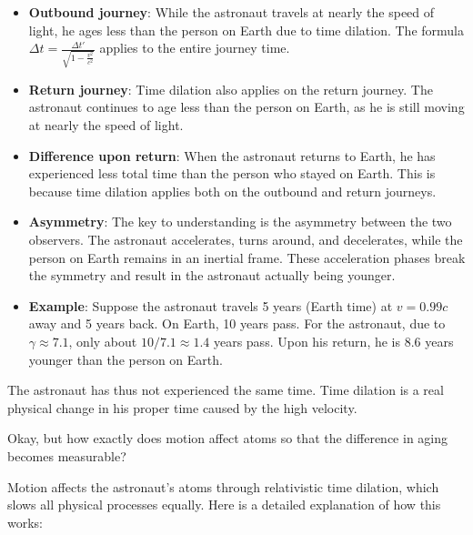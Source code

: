 \documentclass[a4paper,12pt]{article}
\begin{document}
	\begin{itemize}
		\item \textbf{Outbound journey}: While the astronaut travels at nearly the speed of light, he ages less than the person on Earth due to time dilation. The formula \( \Delta t = \frac{\Delta t'}{\sqrt{1 - \frac{v^2}{c^2}}} \) applies to the entire journey time.
		\item \textbf{Return journey}: Time dilation also applies on the return journey. The astronaut continues to age less than the person on Earth, as he is still moving at nearly the speed of light.
		\item \textbf{Difference upon return}: When the astronaut returns to Earth, he has experienced less total time than the person who stayed on Earth. This is because time dilation applies both on the outbound and return journeys.
		\item \textbf{Asymmetry}: The key to understanding is the asymmetry between the two observers. The astronaut accelerates, turns around, and decelerates, while the person on Earth remains in an inertial frame. These acceleration phases break the symmetry and result in the astronaut actually being younger.
		\item \textbf{Example}: Suppose the astronaut travels 5 years (Earth time) at \( v = 0.99c \) away and 5 years back. On Earth, 10 years pass. For the astronaut, due to \( \gamma \approx 7.1 \), only about \( 10 / 7.1 \approx 1.4 \) years pass. Upon his return, he is 8.6 years younger than the person on Earth.
	\end{itemize}
	
	The astronaut has thus not experienced the same time. Time dilation is a real physical change in his proper time caused by the high velocity.
	
	Okay, but how exactly does motion affect atoms so that the difference in aging becomes measurable?
	
	Motion affects the astronaut's atoms through relativistic time dilation, which slows all physical processes equally. Here is a detailed explanation of how this works:
	
\end{document}
